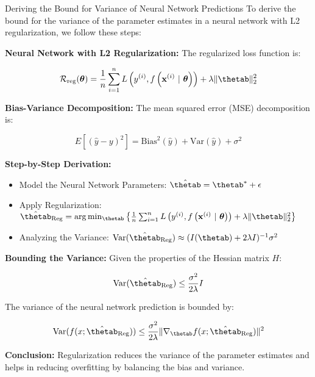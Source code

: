 \documentclass[11pt,compress,t,notes=noshow, xcolor=table]{beamer}
\begin{document}
\begin{vbframe}{Deriving the Bound for Variance of Neural Network Predictions}
To derive the bound for the variance of the parameter estimates in a neural network with L2 regularization, we follow these steps:

\textbf{Neural Network with L2 Regularization:}
The regularized loss function is:

\[
\riskrt = \frac{1}{n} \sum_{i=1}^{n} \Lxyit + \lambda \|\thetab\|_2^2
\]

\textbf{Bias-Variance Decomposition:}
The mean squared error (MSE) decomposition is:

\[
E[(\hat{y} - y)^2] = \text{Bias}^2(\hat{y}) + \text{Var}(\hat{y}) + \sigma^2
\]

\textbf{Step-by-Step Derivation:}
\begin{itemize}
    \item Model the Neural Network Parameters: \( \hat{\thetab} = \thetab^* + \epsilon \)
    \item Apply Regularization: \( \hat{\thetab}_{\text{Reg}} = \arg \min_{\thetab} \left\{ \frac{1}{n} \sum_{i=1}^{n} \Lxyit + \lambda \|\thetab\|_2^2 \right\} \)
    \item Analyzing the Variance: \( \text{Var}(\hat{\thetab}_{\text{Reg}}) \approx (I(\thetab) + 2\lambda I)^{-1} \sigma^2 \)
\end{itemize}

\textbf{Bounding the Variance:}
Given the properties of the Hessian matrix \(H\):

\[
\text{Var}(\hat{\thetab}_{\text{Reg}}) \leq \frac{\sigma^2}{2\lambda} I
\]

The variance of the neural network prediction is bounded by:

\[
\text{Var}(f(x; \hat{\thetab}_{\text{Reg}})) \leq \frac{\sigma^2}{2\lambda} \|\nabla_{\thetab} f(x; \hat{\thetab}_{\text{Reg}})\|^2
\]

\textbf{Conclusion:}
Regularization reduces the variance of the parameter estimates and helps in reducing overfitting by balancing the bias and variance.
\end{vbframe}
\end{document}
